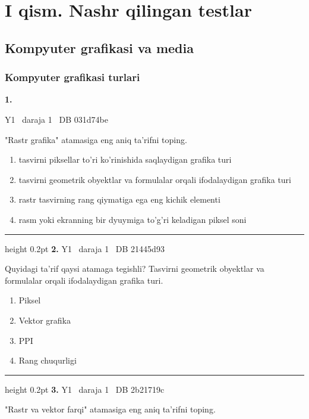 \documentclass[10pt,a4paper,oneside]{article}
\begin{document}
\section{I qism. Nashr qilingan testlar}
\subsection{Kompyuter grafikasi va media}
\subsubsection{Kompyuter grafikasi turlari}
\hypertarget{q1}{\textbf{\color{ink}1.}}  {\color{muted}\scriptsize Y1 \textbullet\ daraja 1 \textbullet\ DB 031d74be}
\par
"Rastr grafika" atamasiga eng aniq ta'rifni toping.
\begin{enumerate}[label=\Alph*),leftmargin=9mm]
\item tasvirni piksellar to'ri ko'rinishida saqlaydigan grafika turi
\item tasvirni geometrik obyektlar va formulalar orqali ifodalaydigan grafika turi
\item rastr tasvirning rang qiymatiga ega eng kichik elementi
\item rasm yoki ekranning bir dyuymiga to'g'ri keladigan piksel soni
\end{enumerate}
\vspace{2mm}\hrule height 0.2pt \vspace{4mm}
\hypertarget{q2}{\textbf{\color{ink}2.}}  {\color{muted}\scriptsize Y1 \textbullet\ daraja 1 \textbullet\ DB 21445d93}
\par
Quyidagi ta'rif qaysi atamaga tegishli? Tasvirni geometrik obyektlar va formulalar orqali ifodalaydigan grafika turi.
\begin{enumerate}[label=\Alph*),leftmargin=9mm]
\item Piksel
\item Vektor grafika
\item PPI
\item Rang chuqurligi
\end{enumerate}
\vspace{2mm}\hrule height 0.2pt \vspace{4mm}
\hypertarget{q3}{\textbf{\color{ink}3.}}  {\color{muted}\scriptsize Y1 \textbullet\ daraja 1 \textbullet\ DB 2b21719c}
\par
"Rastr va vektor farqi" atamasiga eng aniq ta'rifni toping.
\end{document}
